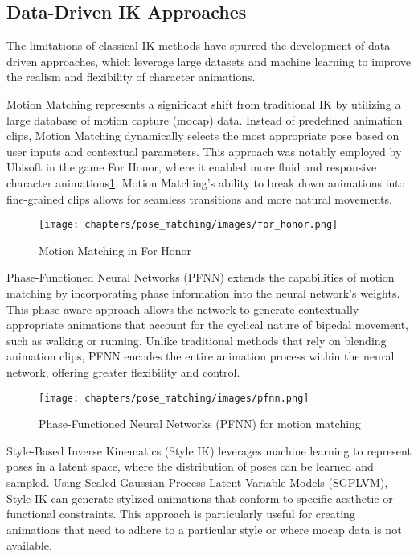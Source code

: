 \documentclass[../../main.tex]{subfiles}
\begin{document}
\subsection{Data-Driven IK Approaches}
\label{subsec:data_driven_ik}

The limitations of classical IK methods have spurred the development of data-driven approaches, which leverage large datasets and machine learning to improve the realism and flexibility of character animations.

Motion Matching represents a significant shift from traditional IK by utilizing a large database of motion capture (mocap) data. Instead of predefined animation clips, Motion Matching dynamically selects the most appropriate pose based on user inputs and contextual parameters. This approach was notably employed by Ubisoft in the game For Honor, where it enabled more fluid and responsive character animations\ref{fig:for_honor}. Motion Matching's ability to break down animations into fine-grained clips allows for seamless transitions and more natural movements\cite{TODO}.

\begin{figure}
  \centering \texttt{[image: chapters/pose\_matching/images/for\_honor.png]}
  \caption{Motion Matching in For Honor}
  \label{fig:for_honor}
\end{figure}

Phase-Functioned Neural Networks (PFNN) \cite{TODO} extends the capabilities of motion matching by incorporating phase information into the neural network's weights. This phase-aware approach allows the network to generate contextually appropriate animations that account for the cyclical nature of bipedal movement, such as walking or running. Unlike traditional methods that rely on blending animation clips, PFNN encodes the entire animation process within the neural network, offering greater flexibility and control.

\begin{figure}
  \centering \texttt{[image: chapters/pose\_matching/images/pfnn.png]}
  \caption{Phase-Functioned Neural Networks (PFNN) for motion matching}
  \label{fig:pfnn}
\end{figure}

Style-Based Inverse Kinematics (Style IK) leverages machine learning to represent poses in a latent space, where the distribution of poses can be learned and sampled. Using Scaled Gaussian Process Latent Variable Models (SGPLVM), Style IK can generate stylized animations that conform to specific aesthetic or functional constraints. This approach is particularly useful for creating animations that need to adhere to a particular style or where mocap data is not available\cite{TODO}.
\end{document}
